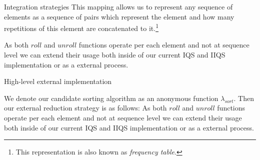 \documentclass{beamer}
\begin{document}
\begin{frame}{Integration strategies}
    This mapping allows us to represent any sequence of elements as a sequence of pairs which represent the element and how many repetitions of this element are concatenated to it.\footnote{This representation is also known as \emph{frequency table}.}\\
    \vfill

    As both $roll$ and $unroll$ functions operate per each element and not at sequence level we can extend their usage both inside of our current IQS and IIQS implementation or as a external process.\\

\end{frame}


\begin{frame}{High-level external implementation}

    We denote our candidate sorting algorithm as an anonymous function $\lambda_{sort}$. Then our external reduction strategy is as follows:
    \vfill
    \vfill
    As both $roll$ and $unroll$ functions operate per each element and not at sequence level we can extend their usage both inside of our current IQS and IIQS implementation or as a external process.\\


\end{frame}
    
\end{document}
